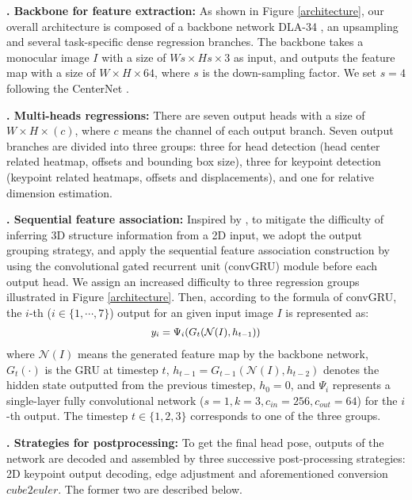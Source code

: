 \documentclass{article}
\begin{document}
{\bf {}. Backbone for feature extraction:}
As shown in Figure \ref{architecture}, our overall architecture is composed of a backbone network DLA-34 \cite{yu2018deep}, an upsampling and several task-specific dense regression branches. The backbone takes a monocular image $I$ with a size of $Ws \times Hs \times 3$ as input, and outputs the feature map with a size of $W \times H \times 64$, where $s$ is the down-sampling factor. We set $s=4$ following the CenterNet \cite{zhou2019objects}.


{\bf {}. Multi-heads regressions:}
There are seven output heads with a size of $W \times H \times (c)$, where $c$ means the channel of each output branch. Seven output branches are divided into three groups: three for head detection (head center related heatmap, offsets and bounding box size), three for keypoint detection (keypoint related heatmaps, offsets and displacements), and one for relative dimension estimation.


{\bf {}. Sequential feature association:}
Inspired by \cite{gao2022monocular}, to mitigate the difficulty of inferring 3D structure information from a 2D input, we adopt the output grouping strategy, and apply the sequential feature association construction by using the convolutional gated recurrent unit (convGRU) \cite{ballas2016delving} module before each output head. We assign an increased difficulty to three regression groups illustrated in Figure \ref{architecture}. Then, according to the formula of convGRU, the $i$-th ($i \in \{1,\cdots,7\}$) output for an given input image $I$ is represented as:
\begin{equation}\small
    \begin{aligned}
	y_i = \Psi_i (G_t(\mathcal{N}(I), h_{t-1}))
    \label{convGRU}
    \end{aligned}
\end{equation}
where $\mathcal{N}(I)$ means the generated feature map by the backbone network, $G_t(\cdot)$ is the GRU at timestep $t$, $h_{t-1}=G_{t-1}(\mathcal{N}(I), h_{t-2})$ denotes the hidden state outputted from the previous timestep, $h_0 = 0$, and $\Psi_i$ represents a single-layer fully convolutional network ($s=1, k=3, c_{in}=256, c_{out}=64$) for the $i$-th output. The timestep $t \in \{1, 2, 3\}$ corresponds to one of the three groups.


{\bf {}. Strategies for postprocessing:} 
To get the final head pose, outputs of the network are decoded and assembled by three successive post-processing strategies: 2D keypoint output decoding, edge adjustment and aforementioned conversion $cube2euler$. The former two are described below.
\end{document}
